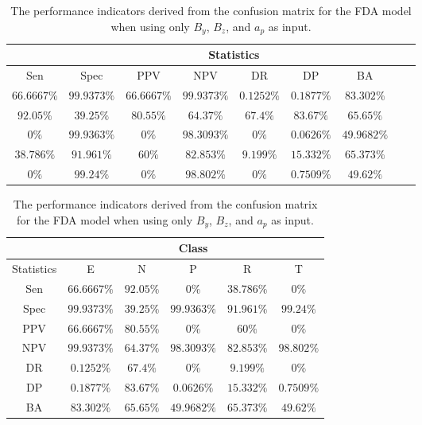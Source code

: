 \begin{table}[!ht]
	\centering
	\begin{tabular}{|c|c|c|c|c|c|c|c|c|}
		\hline
		 & \multicolumn{7}{c|}{Statistics} \\ \hline
		Sen & Spec & PPV & NPV & DR & DP & BA \\ \hline
		$66.6667\%$ & $99.9373\%$ & $66.6667\%$ & $99.9373\%$ & $0.1252\%$ & $0.1877\%$ & $83.302\%$ \\ \hline
		$92.05\%$ & $39.25\%$ & $80.55\%$ & $64.37\%$ & $67.4\%$ & $83.67\%$ & $65.65\%$ \\ \hline
		$0\%$ & $99.9363\%$ & $0\%$ & $98.3093\%$ & $0\%$ & $0.0626\%$ & $49.9682\%$ \\ \hline
		$38.786\%$ & $91.961\%$ & $60\%$ & $82.853\%$ & $9.199\%$ & $15.332\%$ & $65.373\%$ \\ \hline
		$0\%$ & $99.24\%$ & $0\%$ & $98.802\%$ & $0\%$ & $0.7509\%$ & $49.62\%$ \\ \hline
	\end{tabular}
	\caption{The performance indicators derived from the confusion matrix for the FDA model when using only $B_{y}$, $B_{z}$, and $a_{p}$ as input.}
	\label{tab:cs:yzap:fda}
\end{table}

\begin{table}[!ht]
	\centering
	\begin{tabular}{|c|c|c|c|c|c|}
		\hline
		 & \multicolumn{5}{c|}{Class} \\ \hline
		Statistics & E & N & P & R & T \\ \hline
		Sen & $66.6667\%$ & $92.05\%$ & $0\%$ & $38.786\%$ & $0\%$ \\ \hline
		Spec & $99.9373\%$ & $39.25\%$ & $99.9363\%$ & $91.961\%$ & $99.24\%$ \\ \hline
		PPV & $66.6667\%$ & $80.55\%$ & $0\%$ & $60\%$ & $0\%$ \\ \hline
		NPV & $99.9373\%$ & $64.37\%$ & $98.3093\%$ & $82.853\%$ & $98.802\%$ \\ \hline
		DR & $0.1252\%$ & $67.4\%$ & $0\%$ & $9.199\%$ & $0\%$ \\ \hline
		DP & $0.1877\%$ & $83.67\%$ & $0.0626\%$ & $15.332\%$ & $0.7509\%$ \\ \hline
		BA & $83.302\%$ & $65.65\%$ & $49.9682\%$ & $65.373\%$ & $49.62\%$ \\ \hline
	\end{tabular}
	\caption{The performance indicators derived from the confusion matrix for the FDA model when using only $B_{y}$, $B_{z}$, and $a_{p}$ as input.}
	\label{tab:cs:reverse:yzap:fda}
\end{table}
